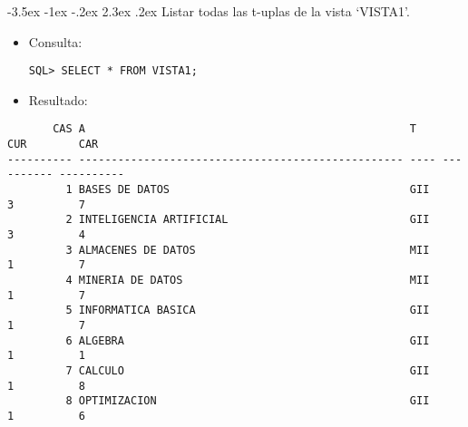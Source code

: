 \documentclass[11pt]{report}
\makeatletter
\renewcommand\chapter{\@startsection{chapter}{0}{\z@}%
    {-3.5ex \@plus -1ex \@minus -.2ex}%
    {2.3ex \@plus.2ex}%
    {\normalfont\Large\bfseries}}
\makeatother
\begin{document}
\chapter{Listar todas las t-uplas de la vista ‘VISTA1’.}
\begin{itemize}
  \item Consulta:
  \begin{verbatim}
SQL> SELECT * FROM VISTA1;
  \end{verbatim}
  \item{Resultado:}
\end{itemize}
  \begin{verbatim}
       CAS A                                                  T           CUR        CAR                                                                                                                
---------- -------------------------------------------------- ---- ---------- ----------                                                                                                                
         1 BASES DE DATOS                                     GII           3          7                                                                                                                
         2 INTELIGENCIA ARTIFICIAL                            GII           3          4                                                                                                                
         3 ALMACENES DE DATOS                                 MII           1          7                                                                                                                
         4 MINERIA DE DATOS                                   MII           1          7                                                                                                                
         5 INFORMATICA BASICA                                 GII           1          7                                                                                                                
         6 ALGEBRA                                            GII           1          1                                                                                                                
         7 CALCULO                                            GII           1          8                                                                                                                
         8 OPTIMIZACION                                       GII           1          6                                                                                                                

\end{verbatim}
\end{document}
